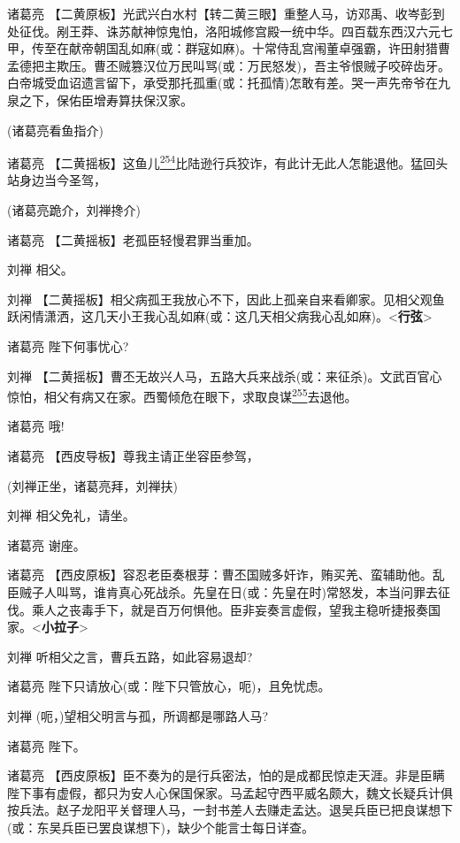 诸葛亮
【二黄原板】光武兴白水村【转二黄三眼】重整人马，访邓禹、收岑彭到处征伐。剐王莽、诛苏献神惊鬼怕，洛阳城修宫殿一统中华。四百载东西汉六元七甲，传至在献帝朝国乱如麻(或：群寇如麻)。十常侍乱宫闱董卓强霸，许田射猎曹孟德把主欺压。曹丕贼篡汉位万民叫骂(或：万民怒发)，吾主爷恨贼子咬碎齿牙。白帝城受血诏遗言留下，承受那托孤重(或：托孤情)怎敢有差。哭一声先帝爷在九泉之下，保佑臣增寿算扶保汉家。

(诸葛亮看鱼指介)

诸葛亮
【二黄摇板】这鱼儿\protect\hyperlink{fn254}{\textsuperscript{254}}比陆逊行兵狡诈，有此计无此人怎能退他。猛回头站身边当今圣驾，

(诸葛亮跪介，刘禅搀介)

诸葛亮 【二黄摇板】老孤臣轻慢君罪当重加。

刘禅 相父。

刘禅
【二黄摇板】相父病孤王我放心不下，因此上孤亲自来看卿家。见相父观鱼跃闲情潇洒，这几天小王我心乱如麻(或：这几天相父病我心乱如麻)。\textless{}\textbf{行弦}\textgreater{}

诸葛亮 陛下何事忧心?

刘禅
【二黄摇板】曹丕无故兴人马，五路大兵来战杀(或：来征杀)。文武百官心惊怕，相父有病又在家。西蜀倾危在眼下，求取良谋\protect\hyperlink{fn255}{\textsuperscript{255}}去退他。

诸葛亮 哦!

诸葛亮 【西皮导板】尊我主请正坐容臣参驾，

(刘禅正坐，诸葛亮拜，刘禅扶)

刘禅 相父免礼，请坐。

诸葛亮 谢座。

诸葛亮
【西皮原板】容忍老臣奏根芽：曹丕国贼多奸诈，贿买羌、蛮辅助他。乱臣贼子人叫骂，谁肯真心死战杀。先皇在日(或：先皇在时)常怒发，本当问罪去征伐。乘人之丧毒手下，就是百万何惧他。臣非妄奏言虚假，望我主稳听捷报奏国家。\textless{}\textbf{小拉子}\textgreater{}

刘禅 听相父之言，曹兵五路，如此容易退却?

诸葛亮 陛下只请放心(或：陛下只管放心，呃)，且免忧虑。

刘禅 (呃，)望相父明言与孤，所调都是哪路人马?

诸葛亮 陛下。

诸葛亮
【西皮原板】臣不奏为的是行兵密法，怕的是成都民惊走天涯。非是臣瞒陛下事有虚假，都只为安人心保国保家。马孟起守西平威名颇大，魏文长疑兵计俱按兵法。赵子龙阳平关督理人马，一封书差人去赚走孟达。退吴兵臣已把良谋想下(或：东吴兵臣已罢良谋想下)，缺少个能言士每日详查。

